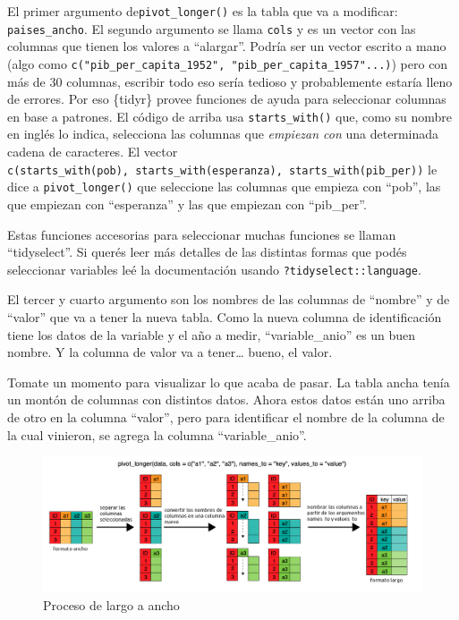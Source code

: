 \documentclass[
  openany]{book}
\begin{document}
El primer argumento de\texttt{pivot\_longer()} es la tabla que va a modificar: \texttt{paises\_ancho}.
El segundo argumento se llama \texttt{cols} y es un vector con las columnas que tienen los valores a ``alargar''.
Podría ser un vector escrito a mano (algo como \texttt{c("pib\_per\_capita\_1952",\ "pib\_per\_capita\_1957"...)}) pero con más de 30 columnas, escribir todo eso sería tedioso y probablemente estaría lleno de errores.
Por eso \{tidyr\} provee funciones de ayuda para seleccionar columnas en base a patrones.
El código de arriba usa \texttt{starts\_with()} que, como su nombre en inglés lo indica, selecciona las columnas que \emph{empiezan con} una determinada cadena de caracteres.
El vector \texttt{c(starts\_with(\textquotesingle{}pob\textquotesingle{}),\ starts\_with(\textquotesingle{}esperanza\textquotesingle{}),\ starts\_with(\textquotesingle{}pib\_per\textquotesingle{}))} le dice a \texttt{pivot\_longer()} que seleccione las columnas que empieza con ``pob'', las que empiezan con ``esperanza'' y las que empiezan con ``pib\_per''.

Estas funciones accesorias para seleccionar muchas funciones se llaman ``tidyselect''.
Si querés leer más detalles de las distintas formas que podés seleccionar variables leé la documentación usando \texttt{?tidyselect::language}.

El tercer y cuarto argumento son los nombres de las columnas de ``nombre'' y de ``valor'' que va a tener la nueva tabla.
Como la nueva columna de identificación tiene los datos de la variable y el año a medir, ``variable\_anio'' es un buen nombre.
Y la columna de valor va a tener\ldots{} bueno, el valor.

Tomate un momento para visualizar lo que acaba de pasar.
La tabla ancha tenía un montón de columnas con distintos datos.
Ahora estos datos están uno arriba de otro en la columna ``valor'', pero para identificar el nombre de la columna de la cual vinieron, se agrega la columna ``variable\_anio''.

\begin{figure}
\centering
\includegraphics{img/ancho-a-largo.png}
\caption{Proceso de largo a ancho}
\end{figure}
\end{document}
